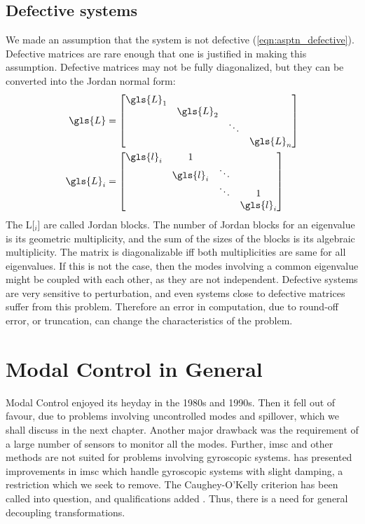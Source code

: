 \subsection{Defective systems}
We made an assumption that the system is not defective (\autoref{eqn:asptn_defective}).
Defective matrices are rare enough that one is justified in making this assumption. 
Defective matrices may not be fully diagonalized, but they can be converted into 
the Jordan normal form:
\begin{align}
 \gls{L} &= \begin{bmatrix}
	\gls{L}_1 & & & \\
	 & \gls{L}_2 & & \\
	 & & \ddots & \\
	 & & & \gls{L}_n	
\end{bmatrix} \\
\gls{L}_i &= \begin{bmatrix}
	\gls{l}_i & 1 & & \\
 	 & \gls{l}_i & \ddots & \\
 	 & & \ddots & 1 \\
 	 & & & \gls{l}_i
\end{bmatrix}
\end{align}
The \gls{L}[$_i$] are called Jordan blocks.
The number of Jordan blocks for an eigenvalue is its geometric multiplicity,
and the sum of the sizes of the blocks is its algebraic multiplicity. The 
matrix is diagonalizable iff both multiplicities are same for all eigenvalues.
If this is not the case, then the modes involving a common eigenvalue
might be coupled with each other, as they are not independent. Defective 
systems are very sensitive to perturbation, and even systems close to
defective matrices suffer from this problem. Therefore an error in 
computation, due to round-off error, or truncation, can change the 
characteristics of the problem. 

\section{Modal Control in General}
\label{intro_modal_general}
Modal Control enjoyed its heyday in the 1980s and 1990s. Then it fell out of favour, 
due to problems involving uncontrolled modes and spillover, which we shall discuss in 
the next chapter. Another major drawback was the requirement of a large number of 
sensors to monitor all the modes. Further, \gls{imsc} and other methods are not suited 
for problems involving gyroscopic systems. \citet{Meirovitch19791} has presented 
improvements in \gls{imsc} which handle gyroscopic systems with slight damping,
a restriction which we seek to remove. The Caughey-O'Kelly criterion has been called 
into question, and qualifications added \citep{A2003741}. Thus, there is a need for 
general decoupling transformations.

